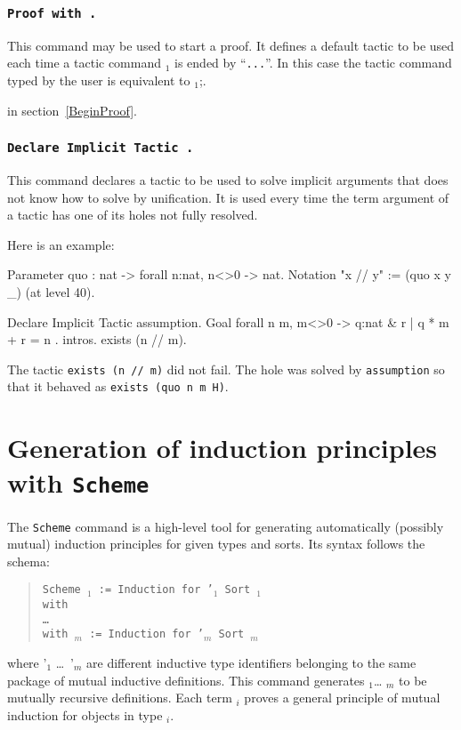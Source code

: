\subsubsection[\tt Proof with {\tac}.]{\tt Proof with {\tac}.\label{ProofWith}
}

  This command may be used to start a proof. It defines a default
  tactic to be used each time a tactic command {\tac$_1$} is ended by
  ``\verb#...#''. In this case the tactic command typed by the user is
  equivalent to \tac$_1$;{\tac}.

 in section~\ref{BeginProof}.

\subsubsection[\tt Declare Implicit Tactic {\tac}.]{\tt Declare Implicit Tactic {\tac}.}

This command declares a tactic to be used to solve implicit arguments
that {\Coq} does not know how to solve by unification. It is used
every time the term argument of a tactic has one of its holes not
fully resolved.

Here is an example:

\begin{coq_example}
Parameter quo : nat -> forall n:nat, n<>0 -> nat.
Notation "x // y" := (quo x y _) (at level 40).

Declare Implicit Tactic assumption.
Goal forall n m, m<>0 -> { q:nat & { r | q * m + r = n } }.
intros.
exists (n // m).
\end{coq_example}

The tactic {\tt exists (n // m)} did not fail. The hole was solved by
{\tt assumption} so that it behaved as {\tt exists (quo n m H)}.

\section{Generation of induction principles with {\tt Scheme}
\label{Scheme}
}

The {\tt Scheme} command is a high-level tool for generating
automatically (possibly mutual) induction principles for given types
and sorts.  Its syntax follows the schema:
\begin{quote}
{\tt Scheme {\ident$_1$} := Induction for \ident'$_1$ Sort {\sort$_1$} \\
  with\\
  \mbox{}\hspace{0.1cm} \dots\\
        with {\ident$_m$} := Induction for {\ident'$_m$} Sort
        {\sort$_m$}}
\end{quote}
where \ident'$_1$ \dots\ \ident'$_m$ are different inductive type
identifiers belonging to the same package of mutual inductive
definitions. This command generates {\ident$_1$}\dots{} {\ident$_m$}
to be mutually recursive definitions. Each term {\ident$_i$} proves a
general principle of mutual induction for objects in type {\term$_i$}.

